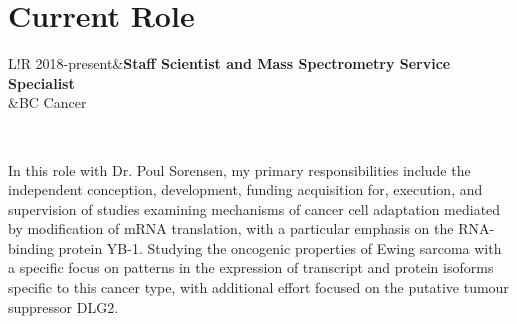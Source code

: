 \documentclass[11pt]{article}
\newcommand\VRule{\color{lightgray}\vrule width 0.5pt}
\begin{document}
\section*{Current Role}
\begin{tabular}{L!{\VRule}R}
	2018-present&\textbf{Staff Scientist and Mass Spectrometry Service Specialist}\\
	&BC Cancer\\
\end{tabular}\\

\begin{addmargin}[7.5em]{2em}%
	In this role with Dr. Poul Sorensen, my primary responsibilities include the independent conception, development, funding acquisition for, execution, and supervision of studies examining mechanisms of cancer cell adaptation mediated by modification of mRNA translation, with a particular emphasis on the RNA-binding protein YB-1. Studying the oncogenic properties of Ewing sarcoma with a specific focus on patterns in the expression of transcript and protein isoforms specific to this cancer type, with additional effort focused on the putative tumour suppressor DLG2.
\end{addmargin}
\end{document}
